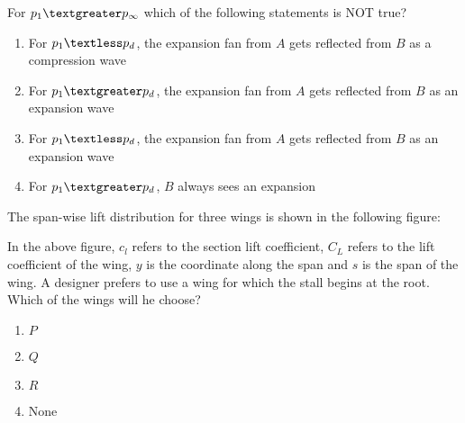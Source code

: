     For $p_1\textgreater p_\infty$ which of the following statements is NOT true?
    \begin{enumerate}
        \item For $p_1\textless p_d$, the expansion fan from $A$ gets reflected from $B$ as a compression wave
        \item For $p_1\textgreater p_d$, the expansion fan from $A$ gets reflected from $B$ as an expansion wave
        \item For $p_1\textless p_d$, the expansion fan from $A$ gets reflected from $B$ as an expansion wave
        \item For $p_1\textgreater p_d$, $B$ always sees an expansion
    \end{enumerate}
    \item The span-wise lift distribution for three wings is shown in the following figure$\colon$

In the above figure, $c_l$ refers to the section lift coefficient, $C_L$ refers to the lift coefficient of the wing, $y$ is the coordinate along the span and $s$ is the span of the wing. A designer prefers to use a wing for which the stall begins at the root. Which of the wings will he choose?
    \begin{enumerate}
        \item $P$
        \item $Q$
        \item $R$
        \item None
    \end{enumerate}
